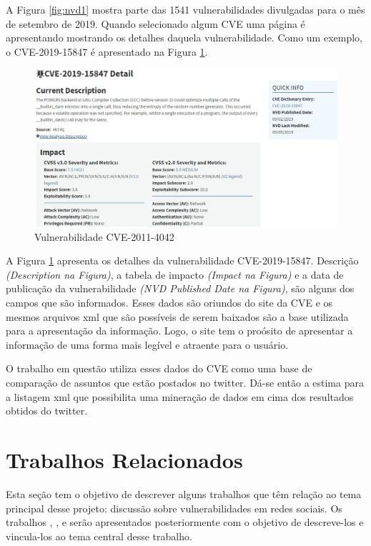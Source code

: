 A Figura \ref{fig:nvd1} mostra parte das 1541 vulnerabilidades divulgadas para o mês de setembro de 2019. Quando selecionado algum CVE uma página é apresentando mostrando os detalhes daquela vulnerabilidade. Como um exemplo, o CVE-2019-15847 é apresentado na Figura \ref{fig:nvd3}.

\begin{figure}[H]
\centering
\includegraphics[width=1\textwidth]{imagens/nvd_exemplo3.png}
\caption{Vulnerabilidade CVE-2011-4042}
\label{fig:nvd3}
\end{figure}

A Figura \ref{fig:nvd3} apresenta os detalhes da vulnerabilidade CVE-2019-15847. Descrição \textit{(Description na Figura)}, a tabela de impacto \textit{(Impact na Figura)} e a data de publicação da vulnerabilidade \textit{(NVD Published Date na Figura)}, são alguns dos campos que são informados. Esses dados são oriundos do site da CVE e os mesmos arquivos xml que são possíveis de serem baixados são a base utilizada para a apresentação da informação. Logo, o site tem o proósito de apresentar a informação de uma forma mais legível e atraente para o usuário. 

O trabalho em questão utiliza esses dados do CVE como uma base de comparação de assuntos que estão postados no twitter. Dá-se então a estima para a listagem xml que possibilita uma mineração de dados em cima dos resultados obtidos do twitter.

\section{Trabalhos Relacionados}

Esta seção tem o objetivo de descrever alguns trabalhos que têm relação ao tema principal desse projeto: discussão sobre vulnerabilidades em redes sociais. Os trabalhos , ,  e  serão apresentados posteriormente com o objetivo de descreve-los e vincula-los ao tema central desse trabalho. 

